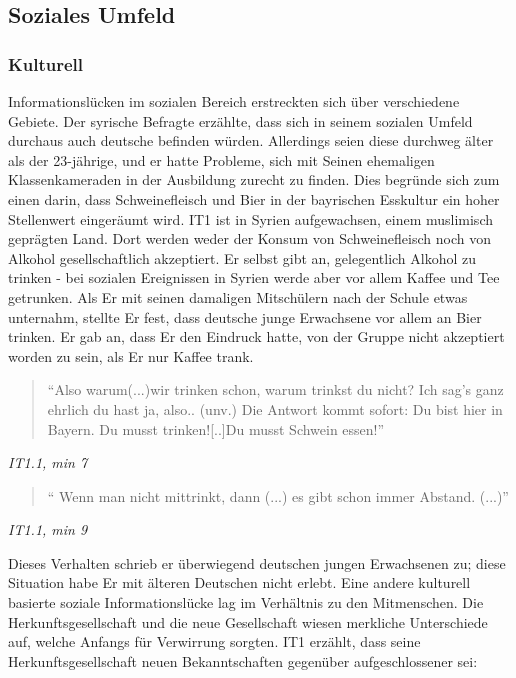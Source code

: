 \subsection{Soziales Umfeld}

\subsubsection{Kulturell}
Informationslücken im sozialen Bereich erstreckten sich über verschiedene Gebiete. Der syrische Befragte erzählte, dass sich in seinem sozialen Umfeld durchaus auch deutsche befinden würden. Allerdings seien diese durchweg älter als der 23-jährige, und er hatte Probleme, sich mit Seinen ehemaligen Klassenkameraden in der Ausbildung zurecht zu finden. Dies begründe sich zum einen darin, dass Schweinefleisch und Bier in der bayrischen Esskultur ein hoher Stellenwert eingeräumt wird. IT1 ist in Syrien aufgewachsen, einem muslimisch geprägten Land. Dort werden weder der Konsum von Schweinefleisch noch von Alkohol gesellschaftlich akzeptiert.\newline
Er selbst gibt an, gelegentlich Alkohol zu trinken - bei sozialen Ereignissen in Syrien werde aber vor allem Kaffee und Tee getrunken. Als Er mit seinen damaligen Mitschülern nach der Schule etwas unternahm, stellte Er fest, dass deutsche junge Erwachsene vor allem an Bier trinken. Er gab an, dass Er den Eindruck hatte, von der Gruppe nicht akzeptiert worden zu sein, als Er nur Kaffee trank.
\begin{quote}
    ``Also warum(...)wir trinken schon, warum trinkst du nicht? Ich sag's ganz ehrlich du hast ja, also.. (unv.) Die Antwort kommt sofort: Du bist hier in Bayern. Du musst trinken![..]Du musst Schwein essen!''
\end{quote}
\centerline{\textit{IT1.1, min 7}}
\begin{quote}
    `` Wenn man nicht mittrinkt, dann (...) es gibt schon immer Abstand. (...)''
\end{quote}
\centerline{\textit{IT1.1, min 9}}
Dieses Verhalten schrieb er überwiegend deutschen jungen Erwachsenen zu; diese Situation habe Er mit älteren Deutschen nicht erlebt.\newline
Eine andere kulturell basierte soziale Informationslücke lag im Verhältnis zu den Mitmenschen. Die Herkunftsgesellschaft und die neue Gesellschaft wiesen merkliche Unterschiede auf, welche Anfangs für Verwirrung sorgten.\newline
IT1 erzählt, dass seine Herkunftsgesellschaft neuen Bekanntschaften gegenüber aufgeschlossener sei:

